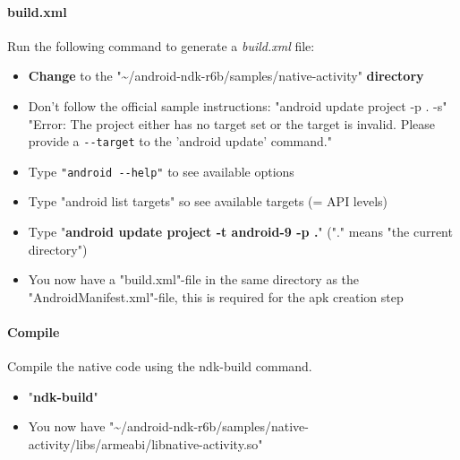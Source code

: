 \paragraph{build.xml}
Run the following command to generate a \emph{build.xml} file:
\begin{itemize}
\item{\textbf{Change} to the "\textasciitilde /android-ndk-r6b/samples/native-activity" \textbf{directory}}
\item{\textrightarrow  Don't follow the official sample instructions: "android update project -p . -s" \textrightarrow  "Error: The project either has no target set or the target is invalid. Please provide a \verb+--target+ to the 'android update' command."}
\item{\textrightarrow  Type \verb+"android --help"+ to see available options}
\item{\textrightarrow  Type "android list targets" so see available targets (= API levels)}
\item{Type "\textbf{android update project -t android-9 -p .}" ("." means "the current directory")}
\item{\textrightarrow  You now have a "build.xml"-file in the same directory as the "AndroidManifest.xml"-file, this is required for the apk creation step}
\end{itemize}


\paragraph{Compile}
Compile the native code using the ndk-build command.
\begin{itemize}
\item{"\textbf{ndk-build}"}
\item{\textrightarrow  You now have "\textasciitilde /android-ndk-r6b/samples/native-activity/libs/armeabi/libnative-activity.so"}
\end{itemize}


